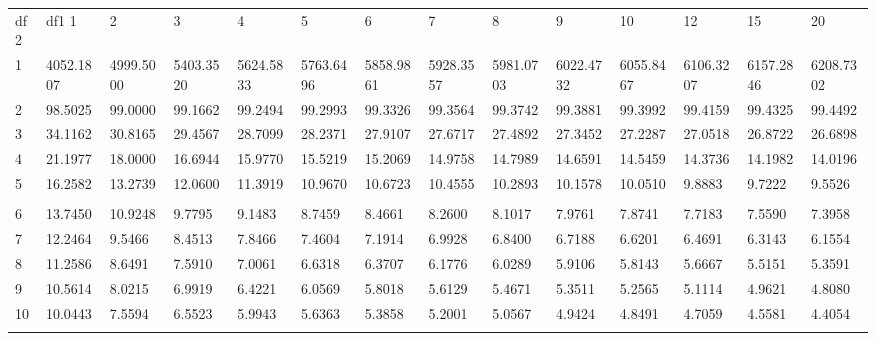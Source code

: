 {
 \fontsize{5pt}{5pt}
 \selectfont
\begin{tabular}{l|lllllllllllll} 
df2  & df1      1  &      2  &      3  &      4  &      5  &      6  &      7  &      8  &      9  &     10  &     12  &     15  &     20   \\ 
  1 & 4052.1807 & 4999.5000 & 5403.3520 & 5624.5833 & 5763.6496 & 5858.9861 & 5928.3557 & 5981.0703 & 6022.4732 & 6055.8467 & 6106.3207 & 6157.2846 & 6208.7302 \\[5pt] \arrayrulecolor{light-gray}\hline\arrayrulecolor{black}  
  2 & 98.5025 & 99.0000 & 99.1662 & 99.2494 & 99.2993 & 99.3326 & 99.3564 & 99.3742 & 99.3881 & 99.3992 & 99.4159 & 99.4325 & 99.4492 \\[5pt] \arrayrulecolor{light-gray}\hline\arrayrulecolor{black}  
  3 & 34.1162 & 30.8165 & 29.4567 & 28.7099 & 28.2371 & 27.9107 & 27.6717 & 27.4892 & 27.3452 & 27.2287 & 27.0518 & 26.8722 & 26.6898 \\[5pt] \arrayrulecolor{light-gray}\hline\arrayrulecolor{black}  
  4 & 21.1977 & 18.0000 & 16.6944 & 15.9770 & 15.5219 & 15.2069 & 14.9758 & 14.7989 & 14.6591 & 14.5459 & 14.3736 & 14.1982 & 14.0196 \\[5pt] \arrayrulecolor{light-gray}\hline\arrayrulecolor{black}  
  5 & 16.2582 & 13.2739 & 12.0600 & 11.3919 & 10.9670 & 10.6723 & 10.4555 & 10.2893 & 10.1578 & 10.0510 & 9.8883 & 9.7222 & 9.5526 \\[5pt] \arrayrulecolor{light-gray}\hline\arrayrulecolor{black}  
\\ 
  6 & 13.7450 & 10.9248 & 9.7795 & 9.1483 & 8.7459 & 8.4661 & 8.2600 & 8.1017 & 7.9761 & 7.8741 & 7.7183 & 7.5590 & 7.3958 \\[5pt] \arrayrulecolor{light-gray}\hline\arrayrulecolor{black}  
  7 & 12.2464 & 9.5466 & 8.4513 & 7.8466 & 7.4604 & 7.1914 & 6.9928 & 6.8400 & 6.7188 & 6.6201 & 6.4691 & 6.3143 & 6.1554 \\[5pt] \arrayrulecolor{light-gray}\hline\arrayrulecolor{black}  
  8 & 11.2586 & 8.6491 & 7.5910 & 7.0061 & 6.6318 & 6.3707 & 6.1776 & 6.0289 & 5.9106 & 5.8143 & 5.6667 & 5.5151 & 5.3591 \\[5pt] \arrayrulecolor{light-gray}\hline\arrayrulecolor{black}  
  9 & 10.5614 & 8.0215 & 6.9919 & 6.4221 & 6.0569 & 5.8018 & 5.6129 & 5.4671 & 5.3511 & 5.2565 & 5.1114 & 4.9621 & 4.8080 \\[5pt] \arrayrulecolor{light-gray}\hline\arrayrulecolor{black}  
 10 & 10.0443 & 7.5594 & 6.5523 & 5.9943 & 5.6363 & 5.3858 & 5.2001 & 5.0567 & 4.9424 & 4.8491 & 4.7059 & 4.5581 & 4.4054 \\[5pt] \arrayrulecolor{light-gray}\hline\arrayrulecolor{black}  

\end{tabular}}
